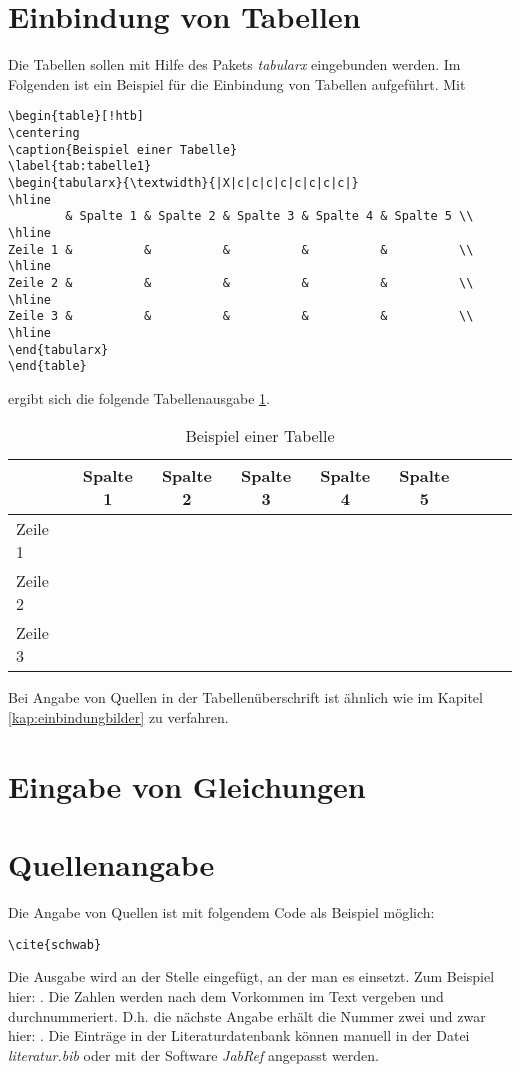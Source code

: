 \section{Einbindung von Tabellen}
\label{kap:einbindungtabellen}
Die Tabellen sollen mit Hilfe des Pakets \textit{tabularx} eingebunden werden. Im Folgenden ist ein Beispiel für die Einbindung von Tabellen aufgeführt. Mit
\begin{verbatim}
\begin{table}[!htb]
\centering
\caption{Beispiel einer Tabelle}
\label{tab:tabelle1}
\begin{tabularx}{\textwidth}{|X|c|c|c|c|c|c|c|c|}
\hline
        & Spalte 1 & Spalte 2 & Spalte 3 & Spalte 4 & Spalte 5 \\
\hline
Zeile 1 &          &          &          &          &          \\
\hline
Zeile 2 &          &          &          &          &          \\
\hline
Zeile 3 &          &          &          &          &          \\
\hline
\end{tabularx}
\end{table}
\end{verbatim}
ergibt sich die folgende Tabellenausgabe \ref{tab:tabelle1}.
\begin{table}[!htb]
\centering
\caption{Beispiel einer Tabelle}
\label{tab:tabelle1}
\vspace{12pt}
\begin{tabularx}{\textwidth}{|X|c|c|c|c|c|c|c|c|}
\hline
 				& Spalte 1 	& Spalte 2 	& Spalte 3 	& Spalte 4 	& Spalte 5 \\
\hline
Zeile 1 & 					& 					& 					& 					& \\
\hline
Zeile 2 & 					& 					& 					& 					& \\
\hline
Zeile 3 & 					& 					& 					& 					& \\
\hline
\end{tabularx}
\end{table}
Bei Angabe von Quellen in der Tabellenüberschrift ist ähnlich wie im Kapitel \ref{kap:einbindungbilder} zu verfahren.

\section{Eingabe von Gleichungen}
\label{kap:einbindunggleichungen}


\section{Quellenangabe}
\label{kap:quellenangabe}
Die Angabe von Quellen ist mit folgendem Code als Beispiel möglich:
\begin{verbatim}
\cite{schwab}
\end{verbatim}
Die Ausgabe wird an der Stelle eingefügt, an der man es einsetzt. Zum Beispiel hier: \cite{schwab}. Die Zahlen werden nach dem Vorkommen im Text vergeben und durchnummeriert. D.h. die nächste Angabe erhält die Nummer zwei und zwar hier: \cite{oedingoswald}. Die Einträge in der Literaturdatenbank können manuell in der Datei \textit{literatur.bib} oder mit der Software \textit{JabRef} angepasst werden.